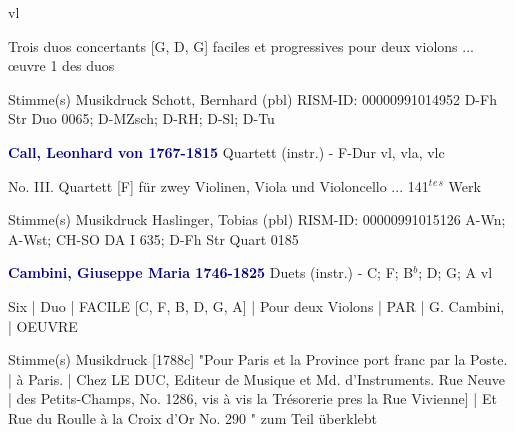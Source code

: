 \documentclass[twocolumn]{book}
\begin{document}
 vl
\newline \begin{itshape}Trois duos concertants [G, D, G] faciles et progressives pour deux violons ... œuvre 1 des duos\end{itshape} 
\newline \textcolor{darkblue}{}  Stimme(s)
\newline Musikdruck
\newline Schott, Bernhard  (pbl)
\newline RISM-ID: 00000991014952
\newline D-Fh  Str Duo 0065; D-MZsch; D-RH; D-Sl; D-Tu
\newline \par \vspace{7pt} \textcolor{darkblue}{\textbf{Call, Leonhard von  1767-1815}}
\newline Quartett (instr.) - F-Dur
 vl, vla, vlc
\newline \begin{itshape}No. III. Quartett [F] für zwey Violinen, Viola und Violoncello ... 141$^t$$^e$$^s$ Werk\end{itshape} 
\newline \textcolor{darkblue}{}  Stimme(s)
\newline Musikdruck
\newline Haslinger, Tobias  (pbl)
\newline RISM-ID: 00000991015126
\newline A-Wn; A-Wst; CH-SO  DA I 635; D-Fh  Str Quart 0185
\newline \par \vspace{7pt} \textcolor{darkblue}{\textbf{Cambini, Giuseppe Maria  1746-1825}}
\newline Duets (instr.) - C; F; B$^b$; D; G; A
 vl
\newline \begin{itshape}Six | Duo | FACILE [C, F, B, D, G, A] | Pour deux Violons | PAR | G. Cambini, | OEUVRE\end{itshape} 
\newline \textcolor{darkblue}{}  Stimme(s)
\newline Musikdruck  [1788c]
\newline "Pour Paris et la Province port franc par la Poste. | à Paris. | Chez LE DUC, Editeur de Musique et Md. d'Instruments. Rue Neuve | des Petits-Champs, No. 1286, vis à vis la Trésorerie pres la Rue Vivienne] | Et Rue du Roulle à la Croix d'Or No. 290 " zum Teil überklebt
\end{document}
